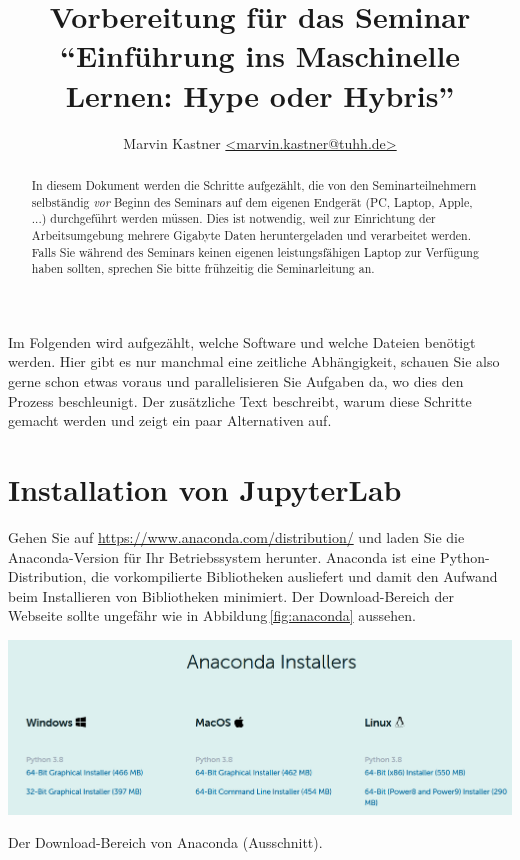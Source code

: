 \documentclass{tufte-handout}
\title{Vorbereitung für das Seminar \enquote{Einführung ins Maschinelle Lernen: Hype oder Hybris}}
\author{Marvin Kastner \href{mailto:marvin.kastner@tuhh.de}{<marvin.kastner@tuhh.de>}}
\begin{document}
\maketitle%

\begin{abstract}
\noindent
In diesem Dokument werden die Schritte aufgezählt, die von den Seminarteilnehmern selbständig \emph{vor} Beginn des Seminars auf dem eigenen Endgerät (PC, Laptop, Apple, ...) durchgeführt werden müssen.
Dies ist notwendig, weil zur Einrichtung der Arbeitsumgebung mehrere Gigabyte Daten heruntergeladen und verarbeitet werden.
Falls Sie während des Seminars keinen eigenen leistungsfähigen Laptop zur Verfügung haben sollten, sprechen Sie bitte frühzeitig die Seminarleitung an.
\end{abstract}

Im Folgenden wird aufgezählt, welche Software und welche Dateien benötigt werden.
Hier gibt es nur manchmal eine zeitliche Abhängigkeit, schauen Sie also gerne schon etwas voraus und parallelisieren Sie Aufgaben da, wo dies den Prozess beschleunigt.
Der zusätzliche Text beschreibt, warum diese Schritte gemacht werden und zeigt ein paar Alternativen auf.


\section{Installation von JupyterLab}

Gehen Sie auf
\url{https://www.anaconda.com/distribution/} 
und laden Sie die Anaconda-Version für Ihr Betriebssystem herunter.
Anaconda ist eine Python-Distribution, die vorkompilierte Bibliotheken ausliefert und damit den Aufwand beim Installieren von Bibliotheken minimiert.
Der Download-Bereich der Webseite sollte ungefähr wie in Abbildung\,\ref{fig:anaconda} aussehen.

\begin{marginfigure}
  \includegraphics{anaconda}
  \caption{Der Download-Bereich von Anaconda (Ausschnitt).}%
\label{fig:anaconda}
\end{marginfigure}
\end{document}
